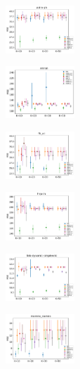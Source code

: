 
\begin{subfigure}
     \centering
         \includegraphics[width=0.23\textwidth]{fig2/astro-ph_wsim_evo2__}
\end{subfigure}
\begin{subfigure}
         \centering
      \includegraphics[width=0.23\textwidth]{fig2/enron_wsim_evo2__}   
\end{subfigure}  
\begin{subfigure}
         \centering          
      \includegraphics[width=0.23\textwidth]{fig2/fb_uc_wsim_evo2__}
\end{subfigure}  
\begin{subfigure}
         \centering          
      \includegraphics[width=0.23\textwidth]{fig2/hep-th_wsim_evo2__}
\end{subfigure}  
\begin{subfigure}
         \centering
      \includegraphics[width=0.23\textwidth]{fig2/wiki-link_wsim_evo2__}
\end{subfigure} 
\begin{subfigure}
         \centering
      \includegraphics[width=0.23\textwidth]{fig2/moreno_names_wsim_evo2__}
\end{subfigure} 
